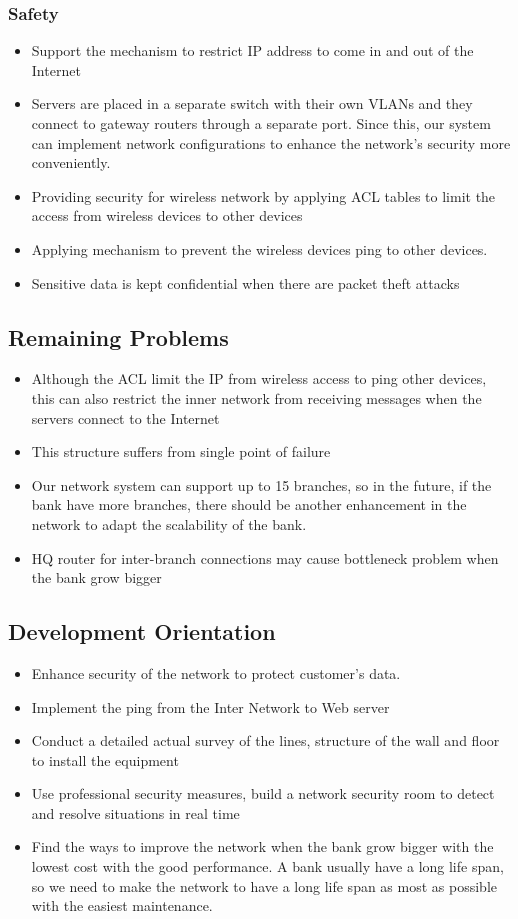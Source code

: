 \subsubsection{Safety}
\begin{itemize}
  \item Support the mechanism to restrict IP address to come in and out of the Internet
  \item Servers are placed in a separate switch with their own VLANs and they connect to gateway routers through a separate port. Since this, our system can implement network configurations to enhance the network's security more conveniently.
  \item Providing security for wireless network by  applying ACL tables to limit the access from wireless devices to other devices
  \item Applying mechanism to prevent the wireless devices ping to other devices.
  \item Sensitive data is kept confidential when there are packet theft attacks
\end{itemize}

\subsection{Remaining Problems}
\begin{itemize}
  \item Although the ACL limit the IP from wireless access to ping other devices, this can also restrict the inner network from receiving messages when the servers connect to the Internet
  \item This structure suffers from single point of failure
  \item Our network system can support up to 15 branches, so in the future, if the bank have more branches, there should be another enhancement in the network to adapt the scalability of the bank.
  \item HQ router for inter-branch connections may cause bottleneck problem when the bank grow bigger
\end{itemize}

\subsection{Development Orientation}
\begin{itemize}
  \item Enhance security of the network to protect customer's data.
  \item Implement the ping from the Inter Network to Web server
  \item Conduct a detailed actual survey of the lines, structure of the wall and floor to
        install the equipment
  \item Use professional security measures, build a network security room to detect and
        resolve situations in real time
  \item Find the ways to improve the network when the bank grow bigger with the lowest cost with the good performance. A bank usually have a long life span, so we need to make the network to have a long life span as most as possible with the easiest maintenance.
\end{itemize}
